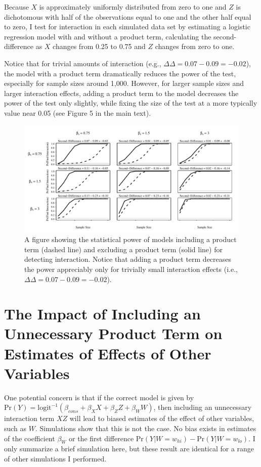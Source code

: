 \documentclass[12pt]{article}
\begin{document}
\begin{appendix}
Because $X$ is approximately uniformly distributed from zero to one and $Z$ is dichotomous with half of the observations equal to one and the other half equal to zero, I test for interaction in each simulated data set by estimating a logistic regression model with and without a product term, calculating the second-difference as $X$ changes from 0.25 to 0.75 and $Z$ changes from zero to one. 

Notice that for trivial amounts of interaction (e.g., $\Delta\Delta = 0.07-0.09 = -0.02$), the model with a product term dramatically reduces the power of the test, especially for sample sizes around 1,000. However, for larger sample sizes and larger interaction effects, adding a product term to the model decreases the power of the test only slightly, while fixing the size of the test at a more typically value near 0.05 (see Figure 5 in the main text).

\begin{figure}[H]
\begin{center}
\includegraphics[scale = .8]{fig/fig-pwr.pdf}
\end{center}\caption{A figure showing the statistical power of models including a product term (dashed line) and excluding a product term (solid line) for detecting interaction. Notice that adding a product term decreases the power appreciably only for trivially small interaction effects (i.e., $\Delta\Delta = 0.07-0.09 = -0.02$).}\label{fig:pwr}
\end{figure}

\section{The Impact of Including an Unnecessary Product Term on Estimates of Effects of Other Variables}

One potential concern is that if the correct model is given by $\text{Pr}(Y) = \text{logit}^{-1}(\beta_{cons} + \beta_XX + \beta_ZZ + \beta_{W}W)$, then including an unnecessary interaction term $XZ$ will lead to biased estimates of the effect of other variables, such as $W$. Simulations show that this is not the case. No bias exists in estimates of the coefficient $\beta_W$ or the first difference $\text{Pr}(Y | W = w_{hi}) - \text{Pr}(Y | W = w_{lo})$. I only summarize a brief simulation here, but these result are identical for a range of other simulations I performed.


\end{appendix}
\end{document}
